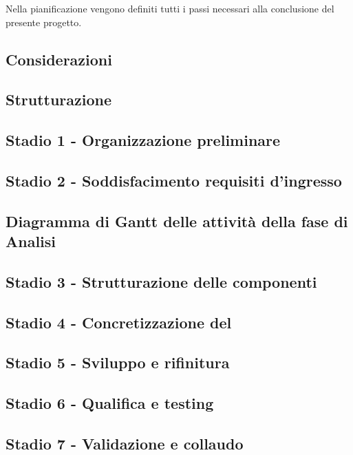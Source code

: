 Nella pianificazione vengono definiti tutti i passi necessari alla conclusione del presente progetto.

\subsection{Considerazioni}\label{sec:Considerazioni}


\subsection{Strutturazione}\label{sec:Strutturazione}


\subsection{Stadio 1 - Organizzazione preliminare}\label{sec:Stadio1}


\subsection{Stadio 2 - Soddisfacimento requisiti d'ingresso}\label{sec:Stadio2}


\newpage
\subsection{Diagramma di Gantt delle attività della fase di Analisi}\label{sec:Stadio2}

    
\subsection{Stadio 3 - Strutturazione delle componenti}\label{sec:Stadio3}

    
\subsection{Stadio 4 - Concretizzazione del }\label{sec:Stadio4}

    
\subsection{Stadio 5 - Sviluppo e rifinitura }\label{sec:Stadio5}

    
\subsection{Stadio 6 - Qualifica e testing}\label{sec:Stadio6}

    
\subsection{Stadio 7 - Validazione e collaudo}\label{sec:Stadio7}

